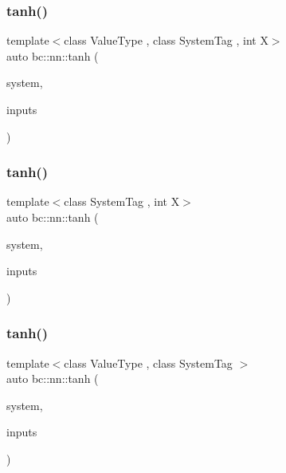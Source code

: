 \mbox{\label{namespacebc_1_1nn_a6b846b0ef196badcc603133bec5e67e9}} 
\subsubsection{\texorpdfstring{tanh()}{tanh()}\hspace{0.1cm}{\footnotesize\ttfamily [1/5]}}
{\footnotesize\ttfamily template$<$class Value\+Type , class System\+Tag , int X$>$ \\
auto bc\+::nn\+::tanh (\begin{DoxyParamCaption}\item[{System\+Tag}]{system,  }\item[{\hyperlink{structbc_1_1Dim}{bc\+::\+Dim}$<$ X $>$}]{inputs }\end{DoxyParamCaption})}

\mbox{\label{namespacebc_1_1nn_a1146aec7724cb368342261c32b77341b}} 
\subsubsection{\texorpdfstring{tanh()}{tanh()}\hspace{0.1cm}{\footnotesize\ttfamily [2/5]}}
{\footnotesize\ttfamily template$<$class System\+Tag , int X$>$ \\
auto bc\+::nn\+::tanh (\begin{DoxyParamCaption}\item[{System\+Tag}]{system,  }\item[{\hyperlink{structbc_1_1Dim}{bc\+::\+Dim}$<$ X $>$}]{inputs }\end{DoxyParamCaption})}

\mbox{\label{namespacebc_1_1nn_a852717a17dfaf0dee293b5765dfc5528}} 
\subsubsection{\texorpdfstring{tanh()}{tanh()}\hspace{0.1cm}{\footnotesize\ttfamily [3/5]}}
{\footnotesize\ttfamily template$<$class Value\+Type , class System\+Tag $>$ \\
auto bc\+::nn\+::tanh (\begin{DoxyParamCaption}\item[{System\+Tag}]{system,  }\item[{\hyperlink{namespacebc_aaf8e3fbf99b04b1b57c4f80c6f55d3c5}{bc\+::size\+\_\+t}}]{inputs }\end{DoxyParamCaption})}

